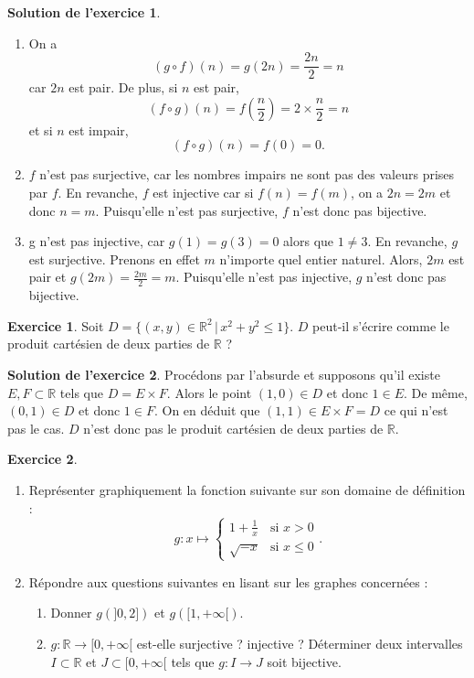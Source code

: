 \documentclass[a4paper, 11pt,openany]{article}%
\theoremstyle{plain}
\theoremstyle{definition}
\newtheorem{exo}{Exercice}
\newtheorem{sol}{Solution de l'exercice}
\theoremstyle{remark}
\newcommand{\R}{\mathbb{R}}
\begin{document}
%
\begin{sol}
\begin{enumerate}
\item On a 
\[ (g \circ f)(n) = g(2n) = \frac{2n}{2} = n\]
car $2n$ est pair. De plus, si $n$ est pair,
\[ (f \circ g)(n) = f \left( \frac{n}{2} \right) = 2 \times \frac{n}{2} = n\]
et si $n$ est impair,
\[ (f \circ g)(n) = f \left( 0 \right) =0.\]
\item $f$ n'est pas surjective, car les nombres impairs ne sont pas des valeurs prises par $f$. En revanche, $f$ est injective car si $f(n)=f(m)$, on a $2n=2m$ et donc $n=m$. Puisqu'elle n'est pas surjective, $f$ n'est donc pas bijective.
\item g n'est pas injective, car $g(1)=g(3)=0$ alors que $1 \neq 3$. En revanche, $g$ est surjective. Prenons en effet $m$ n'importe quel entier naturel. Alors, $2m$ est pair et $g(2m)=\frac{2m}{2} = m$. Puisqu'elle n'est pas injective, $g$ n'est donc pas bijective.
\end{enumerate}
\end{sol}

\begin{exo}
Soit $D = \{(x,y) \in \R^2 \, | \, x^2 + y^2 \leqslant 1\}$. $D$ peut-il s'écrire comme le produit cartésien de deux parties de $\R$ ?
\end{exo}

\begin{sol}
Procédons par l'absurde et supposons qu'il existe $E, F \subset \R$ tels que $D = E \times F$. Alors le point $(1,0) \in D$ et donc $1 \in E$. De même, $(0,1) \in D$ et donc $1 \in F$. On en déduit que $(1,1) \in E \times F = D$ ce qui n'est pas le cas. $D$ n'est donc pas le produit cartésien de deux parties de $\R$.
\end{sol}

\begin{exo}
\begin{enumerate}
\item Représenter graphiquement la fonction suivante sur son domaine de définition :
\[ g : x \mapsto   \left\{
    \begin{array}{ll}
        1 + \frac{1}{x} & \mbox{si } x > 0 \\
        \sqrt{-x} & \mbox{si } x \leqslant 0
    \end{array}
\right..\]
\item Répondre aux questions suivantes en lisant sur les graphes concernées :
\begin{enumerate}
\item Donner $g(]0,2])$ et $g([1,+\infty[)$.
\item $g : \R \to [0,+\infty[$ est-elle surjective ? injective ? Déterminer deux intervalles $I \subset \R$ et $J \subset [0,+\infty[$ tels que $g : I \to J$ soit bijective.
\end{enumerate}
\end{enumerate}
\end{exo}
\end{document}

